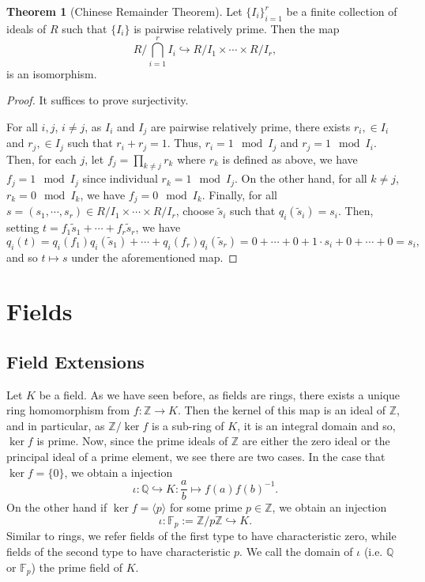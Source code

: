 \documentclass[]{article}
\theoremstyle{definition}
\newtheorem{theorem}{Theorem}
\theoremstyle{definition}
\begin{document}
\begin{theorem}[Chinese Remainder Theorem]
  Let \(\{I_i\}_{i = 1}^r\) be a finite collection of ideals of \(R\) such 
  that \(\{I_i\}\) is pairwise relatively prime. Then the map  
  \[R / \bigcap_{i = 1}^r I_i \hookrightarrow R / I_1 \times \cdots \times R / I_r,\]
  is an isomorphism.
\end{theorem}
\begin{proof}
  It suffices to prove surjectivity. 

  For all \(i, j\), \(i \neq j\), as \(I_i\) and \(I_j\) are pairwise relatively 
  prime, there exists \(r_i, \in I_i\) and \(r_j, \in I_j\) such that 
  \(r_i + r_j = 1\). Thus, \(r_i = 1 \mod I_j\) and \(r_j = 1 \mod I_i\). Then, 
  for each \(j\), let \(f_j = \prod_{k \neq j} r_k\) where \(r_k\) is defined 
  as above, we have \(f_j = 1 \mod I_j\) since individual \(r_k = 1 \mod I_j\). 
  On the other hand, for all \(k \neq j\), \(r_k = 0 \mod I_k\), we have 
  \(f_j = 0 \mod I_k\). Finally, for all 
  \(s = (s_1, \cdots, s_r) \in R / I_1 \times \cdots \times R / I_r\), choose 
  \(\tilde s_i\) such that \(q_i(\tilde s_i) = s_i\). Then, setting 
  \(t = f_1 \tilde s_1 + \cdots + f_r \tilde s_r\), we have 
  \[q_i(t) = q_i(f_1)q_i(\tilde s_1) + \cdots + q_i(f_r)q_i(\tilde s_r) 
    = 0 + \cdots + 0 + 1 \cdot s_i + 0 + \cdots + 0 = s_i,\]
  and so \(t \mapsto s\) under the aforementioned map.
\end{proof}

\newpage
\section{Fields}

\subsection{Field Extensions}

Let \(K\) be a field. As we have seen before, as fields are rings, there exists a 
unique ring homomorphism from \(f : \mathbb{Z} \to K\). Then the kernel of this map 
is an ideal of \(\mathbb{Z}\), and in particular, as \(\mathbb{Z} / \ker f\) is a 
sub-ring of \(K\), it is an integral domain and so, \(\ker f\) is prime. 
Now, since the prime ideals of \(\mathbb{Z}\) are either the zero ideal or 
the principal ideal of a prime element, we see there are two cases. 
In the case that \(\ker f = \{0\}\), we obtain a injection 
\[\iota : \mathbb{Q} \hookrightarrow K : \frac{a}{b} \mapsto f(a)f(b)^{-1}.\]
On the other hand if \(\ker f = \langle p \rangle\) for some prime \(p \in \mathbb{Z}\),
we obtain an injection 
\[\iota : \mathbb{F}_p := \mathbb{Z} / p\mathbb{Z} \hookrightarrow K.\]
Similar to rings, we refer fields of the first type to have characteristic zero, 
while fields of the second type to have characteristic \(p\). We call 
the domain of \(\iota\) (i.e. \(\mathbb{Q}\) or \(\mathbb{F}_p\)) the prime field 
of \(K\).
\end{document}
